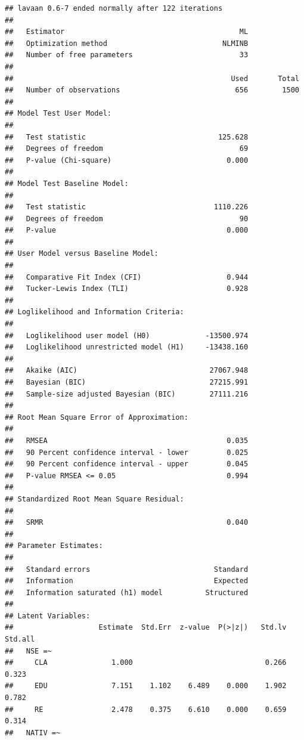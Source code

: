 \documentclass[
  12pt,
]{article}
\begin{document}
\begin{verbatim}
## lavaan 0.6-7 ended normally after 122 iterations
## 
##   Estimator                                         ML
##   Optimization method                           NLMINB
##   Number of free parameters                         33
##                                                       
##                                                   Used       Total
##   Number of observations                           656        1500
##                                                                   
## Model Test User Model:
##                                                       
##   Test statistic                               125.628
##   Degrees of freedom                                69
##   P-value (Chi-square)                           0.000
## 
## Model Test Baseline Model:
## 
##   Test statistic                              1110.226
##   Degrees of freedom                                90
##   P-value                                        0.000
## 
## User Model versus Baseline Model:
## 
##   Comparative Fit Index (CFI)                    0.944
##   Tucker-Lewis Index (TLI)                       0.928
## 
## Loglikelihood and Information Criteria:
## 
##   Loglikelihood user model (H0)             -13500.974
##   Loglikelihood unrestricted model (H1)     -13438.160
##                                                       
##   Akaike (AIC)                               27067.948
##   Bayesian (BIC)                             27215.991
##   Sample-size adjusted Bayesian (BIC)        27111.216
## 
## Root Mean Square Error of Approximation:
## 
##   RMSEA                                          0.035
##   90 Percent confidence interval - lower         0.025
##   90 Percent confidence interval - upper         0.045
##   P-value RMSEA <= 0.05                          0.994
## 
## Standardized Root Mean Square Residual:
## 
##   SRMR                                           0.040
## 
## Parameter Estimates:
## 
##   Standard errors                             Standard
##   Information                                 Expected
##   Information saturated (h1) model          Structured
## 
## Latent Variables:
##                    Estimate  Std.Err  z-value  P(>|z|)   Std.lv  Std.all
##   NSE =~                                                                
##     CLA               1.000                               0.266    0.323
##     EDU               7.151    1.102    6.489    0.000    1.902    0.782
##     RE                2.478    0.375    6.610    0.000    0.659    0.314
##   NATIV =~                                                              

\end{verbatim}
\end{document}
